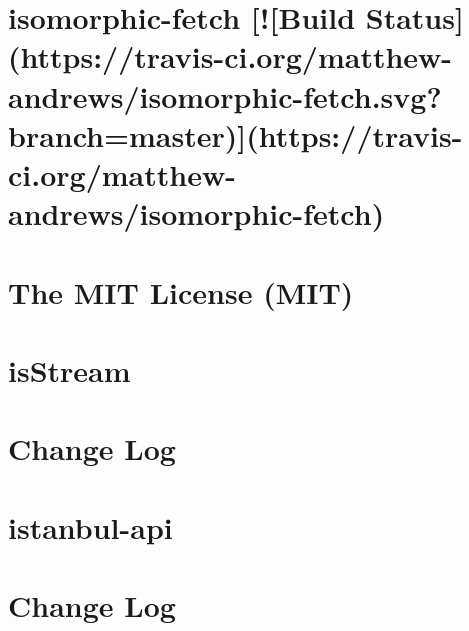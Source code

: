 \documentclass[twoside]{book}
\newcommand{\+}{\discretionary{\mbox{\scriptsize$\hookleftarrow$}}{}{}}
\begin{document}
\chapter{isomorphic-\/fetch \mbox{[}!\mbox{[}Build Status\mbox{]}(https\+://travis-\/ci.org/matthew-\/andrews/isomorphic-\/fetch.svg?branch=master)\mbox{]}(https\+://travis-\/ci.org/matthew-\/andrews/isomorphic-\/fetch)}
\label{md__c_1_workspace_demo_src_main_script_node_modules_isomorphic-fetch__r_e_a_d_m_e}

\chapter{The M\+IT License (M\+IT)}
\label{md__c_1_workspace_demo_src_main_script_node_modules_isstream__l_i_c_e_n_s_e}

\chapter{is\+Stream}
\label{md__c_1_workspace_demo_src_main_script_node_modules_isstream__r_e_a_d_m_e}

\chapter{Change Log}
\label{md__c_1_workspace_demo_src_main_script_node_modules_istanbul-api__c_h_a_n_g_e_l_o_g}

\chapter{istanbul-\/api}
\label{md__c_1_workspace_demo_src_main_script_node_modules_istanbul-api__r_e_a_d_m_e}

\chapter{Change Log}
\label{md__c_1_workspace_demo_src_main_script_node_modules_istanbul-lib-coverage__c_h_a_n_g_e_l_o_g}

\end{document}
